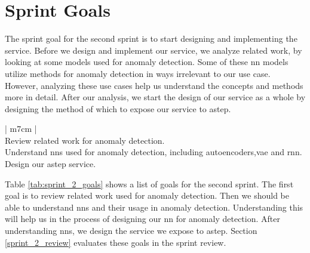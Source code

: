 \section{Sprint Goals}
The sprint goal for the second sprint is to start designing and implementing the service. Before we design and implement our service, we analyze related work, by looking at some models used for anomaly detection. Some of these \gls{nn} models utilize methods for anomaly detection in ways irrelevant to our use case. However, analyzing these use cases help us understand the concepts and methods more in detail. After our analysis, we start the design of our service as a whole by designing the method of which to expose our service to \gls{astep}. \newline

\bgroup
\def\arraystretch{1.8}
\begin{table}[htbp]
    \centering
    \begin{tabular}{| m{7cm} |}
        \hline
         \\
        \hline
        Review related work for anomaly detection. \\
        \hline
        Understand \glspl{nn} used for anomaly detection, including autoencoders,\gls{vae} and \gls{rnn}. \\
        \hline
        Design our \gls{astep} service. \\
        \hline
    \end{tabular}
    \caption{The second sprint goals.}
    \label{tab:sprint_2_goals}
\end{table}
\egroup

\noindent
Table \ref{tab:sprint_2_goals} shows a list of goals for the second sprint. The first goal is to review related work used for anomaly detection. Then we should be able to understand \glspl{nn} and their usage in anomaly detection. Understanding this will help us in the process of designing our \gls{nn} for anomaly detection. After understanding \glspl{nn}, we design the service we expose to \gls{astep}. Section \ref{sprint_2_review} evaluates these goals in the sprint review.
